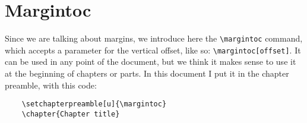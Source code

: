 \section{Margintoc}

Since we are talking about margins, we introduce here the 
\verb|\margintoc| command, which accepts a parameter for the vertical 
offset, like so: \verb|\margintoc[offset]|. It can be used in any point 
of the document, but we think it makes sense to use it at the beginning 
of chapters or parts. In this document I put it in the chapter preamble, 
with this code:


\begin{verbatim}
	\setchapterpreamble[u]{\margintoc}
	\chapter{Chapter title}
\end{verbatim}
